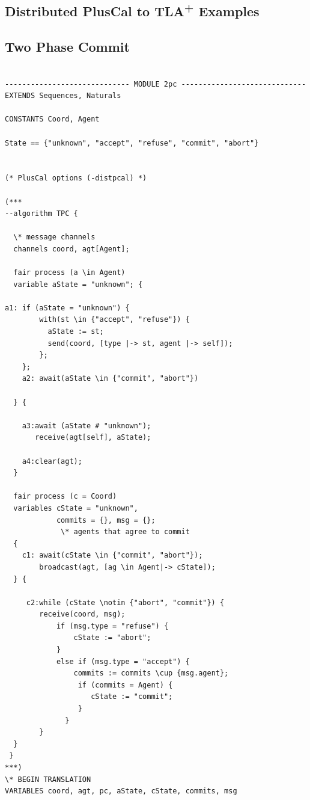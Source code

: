 \documentclass{thesul}
\newcommand{\tlaplus}{TLA\textsuperscript{+}\xspace}
\begin{document}
\begin{appendices}
\chapter{Distributed PlusCal to \tlaplus Examples}
\label{appendix:examples}
\section{Two Phase Commit}

\begin{lstlisting}[caption = \tlaplus translation for Sub-Processes, frame = tlrb, firstnumber = 1]

----------------------------- MODULE 2pc -----------------------------
EXTENDS Sequences, Naturals

CONSTANTS Coord, Agent

State == {"unknown", "accept", "refuse", "commit", "abort"}

    
(* PlusCal options (-distpcal) *)

(***
--algorithm TPC {
 
  \* message channels
  channels coord, agt[Agent];
     
  fair process (a \in Agent)
  variable aState = "unknown"; {

a1: if (aState = "unknown") {
        with(st \in {"accept", "refuse"}) {
          aState := st;
          send(coord, [type |-> st, agent |-> self]);
        };
    };
    a2: await(aState \in {"commit", "abort"})
    
  } {
    
    a3:await (aState # "unknown");
       receive(agt[self], aState); 
       
    a4:clear(agt);
  }

  fair process (c = Coord) 
  variables cState = "unknown",
            commits = {}, msg = {};
             \* agents that agree to commit
  {
    c1: await(cState \in {"commit", "abort"});    
        broadcast(agt, [ag \in Agent|-> cState]);
  } {
        
     c2:while (cState \notin {"abort", "commit"}) {
        receive(coord, msg);
            if (msg.type = "refuse") {
                cState := "abort";
            }
            else if (msg.type = "accept") {
                commits := commits \cup {msg.agent};
                 if (commits = Agent) {
                    cState := "commit";
                 }
              }
        }
  }
 }
***)
\* BEGIN TRANSLATION
VARIABLES coord, agt, pc, aState, cState, commits, msg


\end{lstlisting}
\end{appendices}
\end{document}
